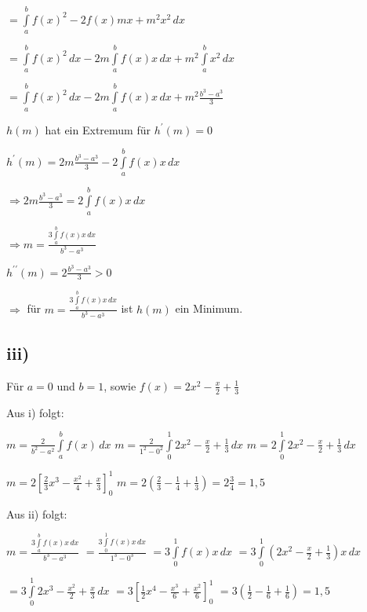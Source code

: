 $ = \int\limits_{a}^{b}f(x)^{2}-2f(x)mx+m^{2}x^{2}\,dx$

$ = \int\limits_{a}^{b}f(x)^{2}\,dx 
-2m\int\limits_{a}^{b}f(x)x\,dx 
+ m^{2}\int\limits_{a}^{b}x^{2}\,dx$

$ = \int\limits_{a}^{b}f(x)^{2}\,dx 
-2m\int\limits_{a}^{b}f(x)x\,dx 
+ m^{2}\frac{b^{3}-a^{3}}{3}$

$h(m)$ hat ein Extremum für $h^{\prime}(m) = 0$

$ h^{\prime}(m) = 2m\frac{b^{3}-a^{3}}{3} - 2\int\limits_{a}^{b}f(x)x\,dx $

$\Rightarrow 2m\frac{b^{3}-a^{3}}{3} =  2\int\limits_{a}^{b}f(x)x\,dx $

$\Rightarrow m =  \frac{3\int\limits_{a}^{b}f(x)x\,dx}{b^{3}-a^{3}} $

$h^{\prime\prime}(m) = 2\frac{b^{3}-a^{3}}{3} > 0$

$\Rightarrow$ für $m = \frac{3\int\limits_{a}^{b}f(x)x\,dx}{b^{3}-a^{3}}$ ist $h(m)$
ein Minimum.


\subsection*{iii)}

Für $a = 0$ und $b = 1$, sowie $f(x) = 2x^{2}-\frac{x}{2} + \frac{1}{3}$ 

Aus i) folgt:

$m = \frac{2}{b^{2}-a^{2}} \int\limits_{a}^{b}f(x) \,dx $
$m = \frac{2}{1^{2}-0^{2}} \int\limits_{0}^{1}2x^{2}-\frac{x}{2} + \frac{1}{3} \,dx$
$m = 2 \int\limits_{0}^{1}2x^{2}-\frac{x}{2} + \frac{1}{3} \,dx $

$m = 2 \left[\frac{2}{3}x^{3} - \frac{x^{2}}{4} + \frac{x}{3}\right]_{0}^{1} $
$m = 2 (\frac{2}{3} - \frac{1}{4} + \frac{1}{3}) = 2 \frac{3}{4} = 1,5 $




Aus ii) folgt:

$m = \frac{3\int\limits_{a}^{b}f(x)x\,dx}{b^{3}-a^{3}} $
$ = \frac{3\int\limits_{0}^{1}f(x)x\,dx}{1^{3}-0^{3}} $
$ = 3\int\limits_{0}^{1}f(x)x\,dx$
$ = 3\int\limits_{0}^{1}(2x^{2}-\frac{x}{2} + \frac{1}{3})x\,dx  $

$ = 3\int\limits_{0}^{1}2x^{3}-\frac{x^{2}}{2} + \frac{x}{3}\,dx  $
$ = 3 \left[\frac{1}{2}x^{4}-\frac{x^{3}}{6} + \frac{x^{2}}{6}\right]^{1}_{0} $
$ = 3 (\frac{1}{2}-\frac{1}{6} + \frac{1}{6}) = 1,5$
